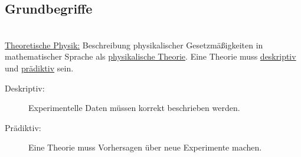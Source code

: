 


\subsection{Grundbegriffe}

~\\


\underline{Theoretische Physik:} Beschreibung physikalischer Gesetzmäßigkeiten in mathematischer Sprache als \underline{physikalische Theorie}. Eine Theorie muss \underline{deskriptiv} und \underline{prädiktiv} sein.\\

\begin{description}
	
	\item[Deskriptiv:] \hfill
	
	Experimentelle Daten müssen korrekt beschrieben werden.\\
	
	\item[Prädiktiv:] \hfill
	
	Eine Theorie muss Vorhersagen über neue Experimente machen.\\
	
\end{description}

